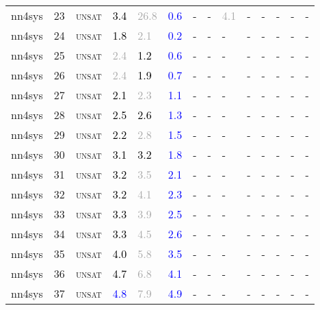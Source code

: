 \begin{center}
{\begin{longtable}{@{}llllllllllllll@{}}
nn4sys & 23 & \textsc{unsat} & \textcolor{black}{3.4} & \textcolor{darkgray}{26.8} & \textcolor{blue}{0.6} & - & - & \textcolor{darkgray}{4.1} & - & - & - & - & - \\
nn4sys & 24 & \textsc{unsat} & \textcolor{black}{1.8} & \textcolor{darkgray}{2.1} & \textcolor{blue}{0.2} & - & - & - & - & - & - & - & - \\
nn4sys & 25 & \textsc{unsat} & \textcolor{darkgray}{2.4} & \textcolor{black}{1.2} & \textcolor{blue}{0.6} & - & - & - & - & - & - & - & - \\
nn4sys & 26 & \textsc{unsat} & \textcolor{darkgray}{2.4} & \textcolor{black}{1.9} & \textcolor{blue}{0.7} & - & - & - & - & - & - & - & - \\
nn4sys & 27 & \textsc{unsat} & \textcolor{black}{2.1} & \textcolor{darkgray}{2.3} & \textcolor{blue}{1.1} & - & - & - & - & - & - & - & - \\
nn4sys & 28 & \textsc{unsat} & \textcolor{black}{2.5} & \textcolor{black}{2.6} & \textcolor{blue}{1.3} & - & - & - & - & - & - & - & - \\
nn4sys & 29 & \textsc{unsat} & \textcolor{black}{2.2} & \textcolor{darkgray}{2.8} & \textcolor{blue}{1.5} & - & - & - & - & - & - & - & - \\
nn4sys & 30 & \textsc{unsat} & \textcolor{black}{3.1} & \textcolor{black}{3.2} & \textcolor{blue}{1.8} & - & - & - & - & - & - & - & - \\
nn4sys & 31 & \textsc{unsat} & \textcolor{black}{3.2} & \textcolor{darkgray}{3.5} & \textcolor{blue}{2.1} & - & - & - & - & - & - & - & - \\
nn4sys & 32 & \textsc{unsat} & \textcolor{black}{3.2} & \textcolor{darkgray}{4.1} & \textcolor{blue}{2.3} & - & - & - & - & - & - & - & - \\
nn4sys & 33 & \textsc{unsat} & \textcolor{black}{3.3} & \textcolor{darkgray}{3.9} & \textcolor{blue}{2.5} & - & - & - & - & - & - & - & - \\
nn4sys & 34 & \textsc{unsat} & \textcolor{black}{3.3} & \textcolor{darkgray}{4.5} & \textcolor{blue}{2.6} & - & - & - & - & - & - & - & - \\
nn4sys & 35 & \textsc{unsat} & \textcolor{black}{4.0} & \textcolor{darkgray}{5.8} & \textcolor{blue}{3.5} & - & - & - & - & - & - & - & - \\
nn4sys & 36 & \textsc{unsat} & \textcolor{black}{4.7} & \textcolor{darkgray}{6.8} & \textcolor{blue}{4.1} & - & - & - & - & - & - & - & - \\
nn4sys & 37 & \textsc{unsat} & \textcolor{blue}{4.8} & \textcolor{darkgray}{7.9} & \textcolor{blue}{4.9} & - & - & - & - & - & - & - & - \\

\end{longtable}}
\end{center}
